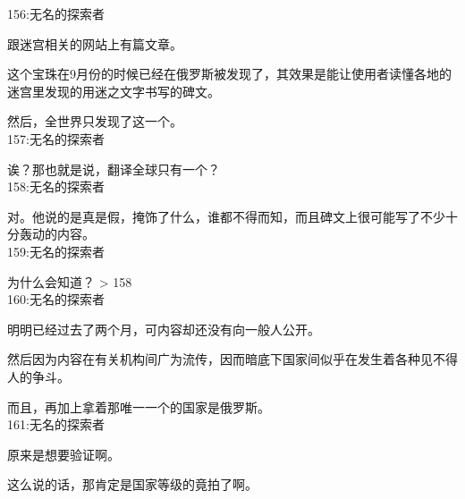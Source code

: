 156:无名的探索者

跟迷宫相关的网站上有篇文章。

这个宝珠在9月份的时候已经在俄罗斯被发现了，其效果是能让使用者读懂各地的迷宫里发现的用迷之文字书写的碑文。

然后，全世界只发现了这一个。\\

157:无名的探索者

诶？那也就是说，翻译全球只有一个？\\

158:无名的探索者

对。他说的是真是假，掩饰了什么，谁都不得而知，而且碑文上很可能写了不少十分轰动的内容。\\

159:无名的探索者

为什么会知道？ > 158\\

160:无名的探索者

明明已经过去了两个月，可内容却还没有向一般人公开。

然后因为内容在有关机构间广为流传，因而暗底下国家间似乎在发生着各种见不得人的争斗。

而且，再加上拿着那唯一一个的国家是俄罗斯。\\

161:无名的探索者

原来是想要验证啊。

这么说的话，那肯定是国家等级的竟拍了啊。\\

